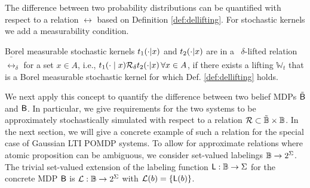 \documentclass{ifacconf}
\newcommand{\new}[1]{{\color{blue}#1}}
\begin{document}
%
%
The difference between two probability distributions can be quantified with respect to a relation $\rel$ based on Definition \ref{def:dellifting}. For stochastic kernels we add a measurability condition.
\begin{definition}
		\new{Borel measurable stochastic kernels $t_1(\cdot {\mid} x)$ and $t_2(\cdot {\mid} x)$ are in a \ $\delta$-lifted relation $\bar \rel_\delta$ for a set $x\in A$, i.e.,  $t_1(\cdot \mid x) \relax \mathcal{R}_\delta t_2(\cdot {\mid} x)\, \forall x\in A$,  if there exists a lifting $\mathbb W_t$ that is a  Borel measurable stochastic kernel for which Def. \ref{def:dellifting} holds. }
\end{definition}
We next apply this concept to quantify the difference between two belief MDPs $\tilde {\mathsf{B}}$ and $\mathsf{B}$. In particular, we give requirements for the two systems  to be approximately stochastically simulated with respect to a relation $\mathcal{R}\subset \tilde {\mathbb{B}} \times \mathbb{B}$. In the next section, we will give a concrete example of such a relation for the special case of Gaussian LTI POMDP systems. To allow for approximate relations where atomic proposition can be ambiguous, we consider set-valued labelings $\mathbb{B}\rightarrow2^\Sigma$. The trivial set-valued extension of the labeling function $\mathsf{L} : \mathbb{B} \rightarrow \Sigma$ for the concrete MDP $\mathsf{B}$ is $\mathcal{L}: \mathbb{B} \rightarrow2^\Sigma$ with $\mathcal{L}(b)=\{\mathsf{L}(b)\}$.
\end{document}
